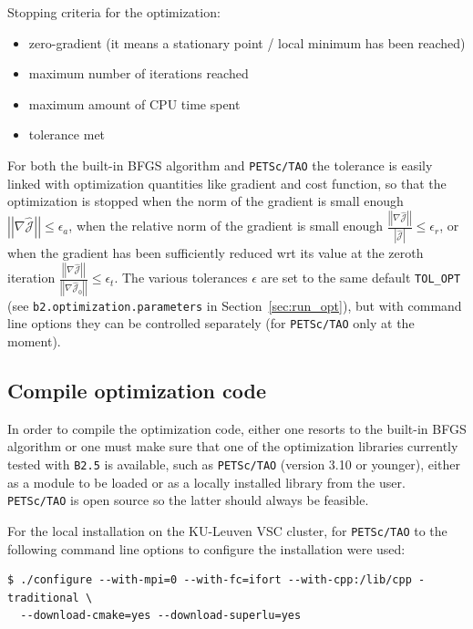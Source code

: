 Stopping criteria for the optimization:
\begin{itemize}
  \item zero-gradient (it means a stationary point / local minimum has been reached)
  \item maximum number of iterations reached
  \item maximum amount of CPU time spent
  \item tolerance met
\end{itemize}

For both the built-in BFGS algorithm and {\tt PETSc/TAO} the tolerance is easily linked with optimization quantities like gradient and cost function, so that the optimization is stopped when the norm of the gradient is small enough $\left|\left |\nabla \hat{\mathcal{J}}\right|\right| \le \epsilon_a$, when the relative norm of the gradient is small enough $\frac{\left|\left |\nabla \hat{\mathcal{J}}\right|\right|}{\left|\hat{\mathcal{J}}\right|} \le \epsilon_r$, or when the gradient has been sufficiently reduced wrt its value at the zeroth iteration $\frac{\left|\left |\nabla \hat{\mathcal{J}}\right|\right|} {\left|\left |\nabla \hat{\mathcal{J}}_0\right|\right|} \le \epsilon_t$. The various tolerances $\epsilon$ are set to the same default {\tt TOL\_OPT} (see {\tt b2.optimization.parameters} in Section~\ref{sec:run_opt}), but with command line options they can be controlled separately (for {\tt PETSc/TAO} only at the moment).

\subsection{Compile optimization code}

In order to compile the optimization code, either one resorts to the built-in BFGS algorithm or one must make sure that one of the optimization libraries currently tested with {\tt B2.5} is available, such as {\tt PETSc/TAO} (version 3.10 or younger), either as a module to be loaded or as a locally installed library from the user. {\tt PETSc/TAO} is open source so the latter should always be feasible.

For the local installation on the KU-Leuven VSC cluster, for {\tt PETSc/TAO} to the following command line options to configure the installation were used:
\begin{verbatim}
$ ./configure --with-mpi=0 --with-fc=ifort --with-cpp:/lib/cpp -traditional \
  --download-cmake=yes --download-superlu=yes
\end{verbatim}

